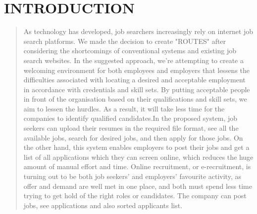 \documentclass[12pt,a4paper,final]{extreport}
\begin{document}


\listoffigures  %





\clearpage
{}
\chapter{INTRODUCTION}
\begin{quote}
{ 
	\par \hspace{01.5cm}As technology has developed, job searchers increasingly rely on internet job search platforms. We made the decision to create "ROUTES" after considering the shortcomings of conventional systems and existing job search websites. In the suggested approach, we're attempting to create a welcoming environment for both employees and employers that lessens the difficulties associated with locating a desired and acceptable employment in accordance with credentials and skill sets. By putting acceptable people in front of the organisation based on their qualifications and skill sets, we aim to lessen the hurdles. As a result, it will take less time for the companies to identify qualified candidates.In the proposed system, job seekers can upload their resumes in the required file format, see all the available jobs, search for desired jobs, and then apply for those jobs. On the other hand, this system enables employers to post their jobs and get a list of all applications which they can screen online, which reduces the huge amount of manual effort and time. Online recruitment, or e-recruitment, is turning out to be both job seekers' and employers’ favourite activity, as offer and demand are well met in one place, and both must spend less time trying to get hold of the right roles or candidates. The company can post jobs, see applications and also sorted applicants list.\\
\newpage
}
\end{quote}
\end{document}
